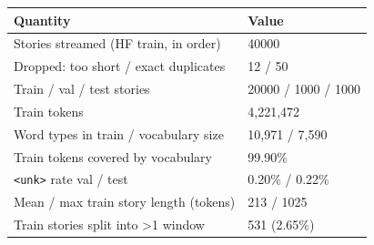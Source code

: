 \begin{tabular}{ll}
\toprule
Quantity & Value \\
\midrule
Stories streamed (HF train, in order) & 40000 \\
Dropped: too short / exact duplicates & 12 / 50 \\
Train / val / test stories & 20000 / 1000 / 1000 \\
Train tokens & 4,221,472 \\
Word types in train / vocabulary size & 10,971 / 7,590 \\
Train tokens covered by vocabulary & 99.90\% \\
\texttt{<unk>} rate val / test & 0.20\% / 0.22\% \\
Mean / max train story length (tokens) & 213 / 1025 \\
Train stories split into >1 window & 531 (2.65\%) \\
\bottomrule
\end{tabular}
